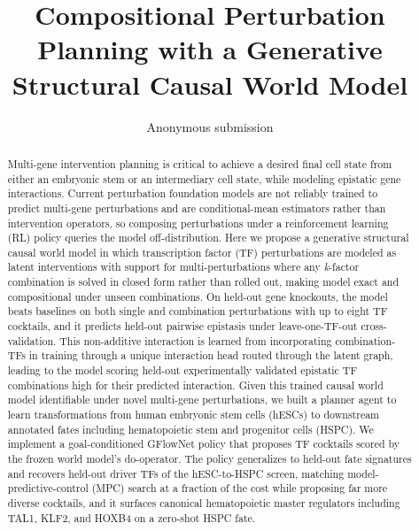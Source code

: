\documentclass{article}
\title{Compositional Perturbation Planning with a Generative Structural Causal World Model}
\author{Anonymous submission}   %
\begin{document}
\maketitle

\begin{abstract}
Multi-gene intervention planning is critical to achieve a desired final cell state from either an embryonic stem or an intermediary cell state, while modeling epistatic gene interactions. Current perturbation foundation models are not reliably trained to predict multi-gene perturbations and are conditional-mean estimators rather than intervention operators, so composing perturbations under a reinforcement learning (RL) policy queries the model off-distribution. Here we propose a generative structural causal world model in which transcription factor (TF) perturbations are modeled as latent interventions with support for multi-perturbations where any \emph{k}-factor combination is solved in closed form rather than rolled out, making model exact and compositional under unseen combinations. On held-out gene knockouts, the model beats baselines on both single and combination perturbations with up to eight TF cocktails, and it predicts held-out pairwise epistasis under leave-one-TF-out
cross-validation. This non-additive interaction is learned from incorporating combination-TFs in training through a unique interaction head routed through the latent graph, leading to the model scoring held-out experimentally validated epistatic TF combinations high for their predicted
interaction. Given this trained causal world model identifiable under novel multi-gene perturbations, we built a planner agent to learn transformations from human embryonic stem cells (hESCs) to downstream annotated fates including hematopoietic stem and progenitor cells (HSPC). We implement a goal-conditioned GFlowNet policy that proposes TF cocktails scored by the frozen world model's do-operator. The policy generalizes to held-out fate signatures and recovers held-out driver TFs of the hESC-to-HSPC screen, matching
model-predictive-control (MPC) search at a fraction of the cost while proposing far more diverse cocktails, and it surfaces canonical hematopoietic master regulators
including TAL1, KLF2, and HOXB4 on a zero-shot HSPC fate.
\end{abstract}
\end{document}

